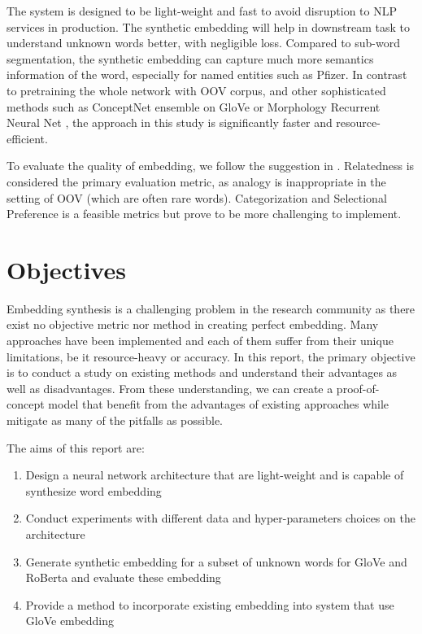 The system is designed to be light-weight and fast to avoid disruption to NLP services in production. The synthetic embedding will help in downstream task to understand unknown words better, with negligible loss. Compared to sub-word segmentation, the synthetic embedding can capture much more semantics information of the word, especially for named entities such as Pfizer. In contrast to pretraining the whole network with OOV corpus, and other sophisticated methods such as ConceptNet ensemble on GloVe \cite{DBLP:journals/corr/VaswaniSPUJGKP17} or Morphology Recurrent Neural Net \cite{luong-etal-2013-better}, the approach in this study is significantly faster and resource-efficient. 

To evaluate the quality of embedding, we follow the suggestion in \cite{schnabel-etal-2015-evaluation}. Relatedness is considered the primary evaluation metric, as analogy is inappropriate in the setting of OOV (which are often rare words). Categorization and Selectional Preference is a feasible metrics but prove to be more challenging to implement. 

\newpage

\section{Objectives}

Embedding synthesis is a challenging problem in the research community as there exist no objective metric nor method in creating perfect embedding. Many approaches have been implemented and each of them suffer from their unique limitations, be it resource-heavy or accuracy. In this report, the primary objective is to conduct a study on existing methods and understand their advantages as well as disadvantages. From these understanding, we can create a proof-of-concept model that benefit from the advantages of existing approaches while mitigate as many of the pitfalls as possible. 

The aims of this report are:

\begin{enumerate}
	 \item Design a neural network architecture that are light-weight and is capable of synthesize word embedding
	\item Conduct experiments with different data and hyper-parameters choices on the architecture 
	\item Generate synthetic embedding for a subset of unknown words for GloVe and RoBerta and evaluate these embedding
	\item Provide a method to incorporate existing embedding into system that use GloVe embedding
\end{enumerate}

